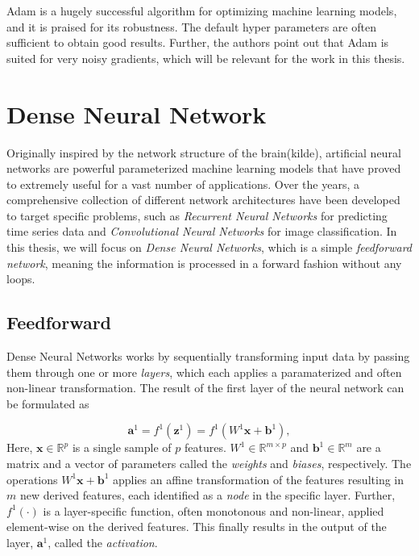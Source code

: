 Adam is a hugely successful algorithm for optimizing machine learning models, and it is praised for its robustness. The default hyper parameters are often sufficient to obtain good results. Further, the authors point out that Adam is suited for very noisy gradients, which will be relevant for the work in this thesis. 



\section{Dense Neural Network}\label{sec:DenseNeuralNetwork}
Originally inspired by the network structure of the brain(kilde), artificial neural networks are powerful parameterized machine learning models that have proved to extremely useful for a vast number of applications. Over the years, a comprehensive collection of different network architectures have been developed to target specific problems, such as \emph{Recurrent Neural Networks} for predicting time series data and \emph{Convolutional Neural Networks} for image classification. In this thesis, we will focus on \emph{Dense Neural Networks}, which is a simple \emph{feedforward network}, meaning the information is processed in a forward fashion without any loops.

\subsection{Feedforward}\label{sec:FeedforwardDNN}
Dense Neural Networks works by sequentially transforming input data by passing them through one or more \emph{layers}, which each applies a paramaterized and often non-linear transformation. The result of the first layer of the neural network can be formulated as

\begin{equation}\label{eq:FeedforwardSingle}
    \boldsymbol{a}^1 = f^1(\boldsymbol{z}^1) = f^1(W^1 \boldsymbol{x} + \boldsymbol{b}^1),
\end{equation}
Here, $\boldsymbol{x} \in \mathbb{R}^p$ is a single sample of $p$ features. $W^1 \in \mathbb{R}^{m \times p}$ and $\boldsymbol{b}^1 \in \mathbb{R}^{m}$ are a matrix and a vector of parameters called the \emph{weights} and \emph{biases}, respectively. The operations $W^1 \boldsymbol{x} + \boldsymbol{b}^1$ applies an affine transformation of the features resulting in $m$ new derived features, each identified as a \emph{node} in the specific layer. Further, $f^1(\cdot)$ is a layer-specific function, often monotonous and non-linear, applied element-wise on the derived features. This finally results in the output of the layer, $\boldsymbol{a}^1$, called the \emph{activation}.

